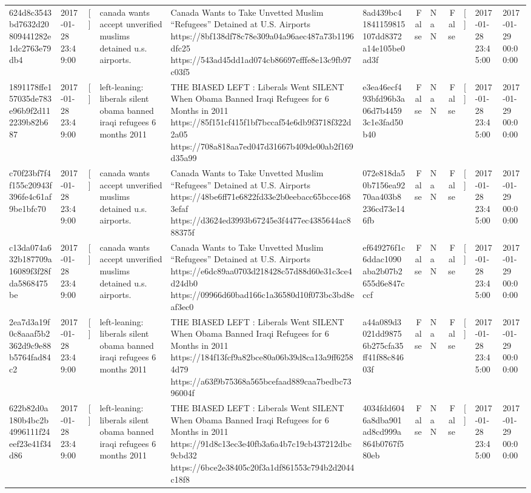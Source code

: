 \begin{tabular}{llllllrlrlll}
624d8c3543bd7632d20809441282e1dc2763e79db4 & 2017-01-28 23:49:00 & [] & canada wants accept unverified muslims detained u.s. airports. & Canada Wants to Take Unvetted Muslim “Refugees” Detained at U.S. Airports https://8bf138df78c78e309a04a96aec487a73b1196dfc25 https://543ad45dd1ad074cb86697efffe8e13c9fb97c03f5 & 8ad439bc41841159815107dd8372a14e105be0ad3f & False & NaN & False & [] & 2017-01-28 23:45:00 & 2017-01-29 00:00:00 \\
1891178ffe157035de783e96b9f2d112239b82b687 & 2017-01-28 23:49:00 & [] & left-leaning: liberals silent obama banned iraqi refugees 6 months 2011 & THE BIASED LEFT : Liberals Went SILENT When Obama Banned Iraqi Refugees for 6 Months in 2011 https://85f151cf415f1bf7bccaf54e6db9f3718f322d2a05 https://708a818aa7ed047d31667b409de00ab2f169d35a99 & e3ea46ecf493bfd96b3a06d7b44593c1e3fad50b40 & False & NaN & False & [] & 2017-01-28 23:45:00 & 2017-01-29 00:00:00 \\
c70f23bf7f4f155c20943f396fe4c61af9be1bfc70 & 2017-01-28 23:49:00 & [] & canada wants accept unverified muslims detained u.s. airports. & Canada Wants to Take Unvetted Muslim “Refugees” Detained at U.S. Airports https://48be6ff71e6822fd33e2b0eebacc65bcce4683efaf https://d3624ed3993b67245e3f4477ec4385644ac888375f & 072e818da50b7156ea9270aa403b8236cd73e146fb & False & NaN & False & [] & 2017-01-28 23:45:00 & 2017-01-29 00:00:00 \\
c13da074a632b187709a16089f3f28fda5868475be & 2017-01-28 23:49:00 & [] & canada wants accept unverified muslims detained u.s. airports. & Canada Wants to Take Unvetted Muslim “Refugees” Detained at U.S. Airports https://e6dc89aa0703d218428c57d88d60e31c3ce4d24db0 https://09966d60bad166c1a36580d10f073bc3bd8eaf3ec0 & ef649276f1c6ddac1090aba2b07b2655d6e847cccf & False & NaN & False & [] & 2017-01-28 23:45:00 & 2017-01-29 00:00:00 \\
2ea7d3a19f0c8aaaf5b2362d9c9e88b5764fad84c2 & 2017-01-28 23:49:00 & [] & left-leaning: liberals silent obama banned iraqi refugees 6 months 2011 & THE BIASED LEFT : Liberals Went SILENT When Obama Banned Iraqi Refugees for 6 Months in 2011 https://184f13fcf9a82bce80a06b39d8ca13a9ff62584d79 https://a63f9b75368a565bcefaad889caa7bedbc7396004f & a44a089d3021dd98756b275cfa35ff41f88c84603f & False & NaN & False & [] & 2017-01-28 23:45:00 & 2017-01-29 00:00:00 \\
622b82d0a180b4bc2b4996111f24eef23e41f34d86 & 2017-01-28 23:49:00 & [] & left-leaning: liberals silent obama banned iraqi refugees 6 months 2011 & THE BIASED LEFT : Liberals Went SILENT When Obama Banned Iraqi Refugees for 6 Months in 2011 https://91d8c13ec3e40fb3a6a4b7c19cb437212dbc9cbd32 https://6bce2e38405c20f3a1df861553c794b2d2044c18f8 & 4034fdd6046a8dba901ad8cd999a864b0767f580eb & False & NaN & False & [] & 2017-01-28 23:45:00 & 2017-01-29 00:00:00 \\

\end{tabular}
